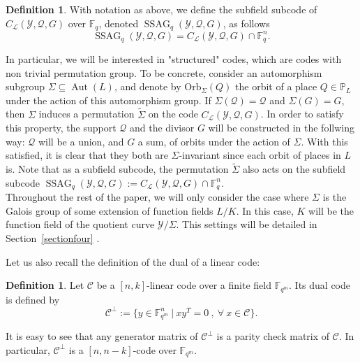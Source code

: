 \documentclass[10pt]{article}
\theoremstyle{definition}
\theoremstyle{definition}
\newtheorem{expl}[thm]{Example}
\theoremstyle{definition}
\newtheorem{def1}[thm]{Definition}
\newcommand{\s}{\vspace{0.3cm}}
\newcommand{\PP}{\mathbb{P}}
\newcommand{\fqm}{\mathbb{F}_{q^m}}
\newcommand{\fq}{\mathbb{F}_q}
\newcommand{\su}{\subseteq}
\newcommand{\Y}{\mathcal{Y}}
\newcommand{\QR}{\mathcal{Q}}
\newcommand{\Aut}{\operatorname{Aut}}
\newcommand{\ssag}{\operatorname{SSAG}}
\newcommand{\calL}{\mathcal{L}}
\begin{document}
\s

\begin{def1}
With notation as above, we define the subfield subcode of $C_{\calL}(\Y,\QR,G)$ over $\fq$, denoted $\ssag_q(\Y,\QR,G)$, as follows
\[ \ssag_q(\Y,\QR,G) = C_{\calL}(\Y,\QR,G) \cap \fq^n.\]
\end{def1}

\s

In particular, we will be interested in "structured" codes, which are codes with non trivial permutation group. To be concrete, consider an automorphism subgroup $\Sigma \su \Aut(L)$, and denote by $\mathrm{Orb}_{\Sigma}(Q)$ the orbit of a place $Q \in \PP_L$ under the action of this automorphism group. If $\Sigma(\QR) = \QR$ and $\Sigma(G)=G$, then $\Sigma$ induces a permutation $\tilde{\Sigma}$ on the code $C_{\calL}(\Y,\QR,G)$. In order to satisfy this property, the support $\QR$ and the divisor $G$ will be constructed in the follwing way: $\QR$ will be a union, and $G$ a sum, of orbits under the action of $\Sigma$. With this satisfied, it is clear that they both are $\Sigma$-invariant since each orbit of places in $L$ is. Note that as a subfield subcode, the permutation $\tilde{\Sigma}$ also acts on the subfield subcode $\ssag_q(\Y,\QR,G):= C_{\calL}(\Y,\QR,G) \cap \fq^n$.\\
\color{purple}
Throughout the rest of the paper, we will only consider the case where $\Sigma$ is the Galois group of some extension of function fields $L/K$. In this case, $K$ will be the function field of the quotient curve $\Y/\Sigma$. This settings will be detailed in Section~\ref{sectionfour}
\color{black}. 


\s

Let us also recall the definition of the dual of a linear code:

\s

\begin{def1}
Let $\mathcal{C}$ be a $[n,k]$-linear code over a finite field $\fqm$. Its dual code is defined by 
\[\mathcal{C}^{\perp} := \{ y \in \fqm^n \ | \ xy^T = 0 \ , \ \forall \ x \in \mathcal{C}\}.\]
\end{def1}
It is easy to see that any generator matrix of $\mathcal{C}^{\perp}$ is a parity check matrix of $\mathcal{C}$. In particular, $\mathcal{C}^{\perp}$ is a $[n,n-k]$-code over $\fqm$.
\end{document}
